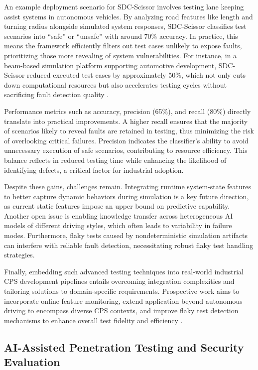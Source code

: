 \documentclass[sigconf]{acmart}
\begin{document}
An example deployment scenario for SDC-Scissor involves testing lane keeping assist systems in autonomous vehicles. By analyzing road features like length and turning radius alongside simulated system responses, SDC-Scissor classifies test scenarios into “safe” or “unsafe” with around 70\% accuracy. In practice, this means the framework efficiently filters out test cases unlikely to expose faults, prioritizing those more revealing of system vulnerabilities. For instance, in a beam-based simulation platform supporting automotive development, SDC-Scissor reduced executed test cases by approximately 50\%, which not only cuts down computational resources but also accelerates testing cycles without sacrificing fault detection quality \cite{ref29}.

Performance metrics such as accuracy, precision (65\%), and recall (80\%) directly translate into practical improvements. A higher recall ensures that the majority of scenarios likely to reveal faults are retained in testing, thus minimizing the risk of overlooking critical failures. Precision indicates the classifier's ability to avoid unnecessary execution of safe scenarios, contributing to resource efficiency. This balance reflects in reduced testing time while enhancing the likelihood of identifying defects, a critical factor for industrial adoption.

Despite these gains, challenges remain. Integrating runtime system-state features to better capture dynamic behaviors during simulation is a key future direction, as current static features impose an upper bound on predictive capability. Another open issue is enabling knowledge transfer across heterogeneous AI models of different driving styles, which often leads to variability in failure modes. Furthermore, flaky tests caused by nondeterministic simulation artifacts can interfere with reliable fault detection, necessitating robust flaky test handling strategies.

Finally, embedding such advanced testing techniques into real-world industrial CPS development pipelines entails overcoming integration complexities and tailoring solutions to domain-specific requirements. Prospective work aims to incorporate online feature monitoring, extend application beyond autonomous driving to encompass diverse CPS contexts, and improve flaky test detection mechanisms to enhance overall test fidelity and efficiency \cite{ref29}.

\subsection{AI-Assisted Penetration Testing and Security Evaluation}
\end{document}
